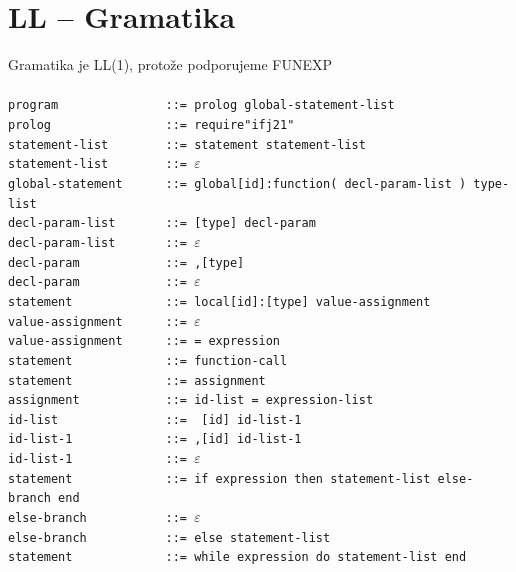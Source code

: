 \documentclass[11pt]{article}
\begin{document}
    \section{LL -- Gramatika}
        \Large{Gramatika je LL(1), protože podporujeme FUNEXP} \\
        \normalsize \\
        \verb|program               ::= prolog global-statement-list| \\
        \verb|prolog                ::= require"ifj21"| \\
        \verb|statement-list        ::= statement statement-list| \\
        \verb|statement-list        ::= |$\varepsilon$ \\
        \verb|global-statement      ::= global[id]:function( decl-param-list ) type-list| \\
        \verb|decl-param-list       ::= [type] decl-param| \\
        \verb|decl-param-list       ::= |$\varepsilon$ \\
        \verb|decl-param            ::= ,[type]| \\
        \verb|decl-param            ::= |$\varepsilon$ \\
        \verb|statement             ::= local[id]:[type] value-assignment| \\
        \verb|value-assignment      ::= |$\varepsilon$ \\
        \verb|value-assignment      ::= = expression| \\
        \verb|statement             ::= function-call| \\
        \verb|statement             ::= assignment| \\
        \verb|assignment            ::= id-list = expression-list| \\
        \verb|id-list               ::=  [id] id-list-1| \\
        \verb|id-list-1             ::= ,[id] id-list-1| \\
        \verb|id-list-1             ::= |$\varepsilon$ \\
        \verb|statement             ::= if expression then statement-list else-branch end| \\
        \verb|else-branch           ::= |$\varepsilon$ \\
        \verb|else-branch           ::= else statement-list| \\
        \verb|statement             ::= while expression do statement-list end| \\
\end{document}
